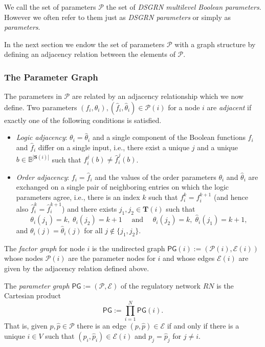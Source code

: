 \documentclass[12pt, notitlepage]{amsart}
\newcommand{\cE}{{\mathcal E}}
\newcommand{\cP}{{\mathcal P}}
\theoremstyle{definition}
\newcommand{\Targets}{\mathbf{T}}
\newcommand{\Sources}{\mathbf{S}}
\newcommand{\PG}{\mathsf{PG}}
\newcommand{\bbB}{\mathbb{B}}
\begin{document}
  We call the set of parameters $\cP$ the set of \textit{DSGRN multilevel Boolean parameters}. However we often refer to them just as \emph{DSGRN parameters} or simply as \textit{parameters}.

  In the next section we endow the set of parameters $\cP$ with a graph structure by defining an adjacency relation between the elements of $\cP$.

  \subsubsection{The Parameter Graph}
  \label{sec:PG}

  The parameters in $\cP$ are related by an adjacency relationship which we now define. Two parameters $(f_i, \theta_i), (\hat{f}_i, \hat{\theta}_i) \in \cP(i)$ for a node $i$ are \textit{adjacent} if exactly one of the following conditions is satisfied.

  \begin{itemize}
    \item \textit{Logic adjacency}: $\theta_i = \hat\theta_i$ and a single component of the Boolean functions $f_i$ and $\hat f_i$ differ on a single input, i.e., there exist a unique $j$ and a unique $b\in\bbB^{|\Sources(i)|}$ such that $f^j_i(b) \neq \hat{f}^j_i(b)$.

    \item \textit{Order adjacency}: $f_i=\hat f_i$ and the values of the order parameters $\theta_i$ and $\hat\theta_i$ are exchanged on a single pair of neighboring entries on which the logic parameters agree, i.e., there is an index $k$ such that $f^k_i= f^{k+1}_i$ (and hence also $\hat f^k_i= \hat f^{k+1}_i$) and  there exists $j_1, j_2 \in \Targets(i)$ such that
      \[
        \theta_i(j_1) = k, \; \theta_i(j_2) = k+1 \quad \mbox{ and } \quad \hat{\theta}_i(j_2) = k, \; \hat{\theta}_i(j_1) = k+1,
      \]
      and $\theta_i(j) = \hat{\theta}_i(j)$ for all $j \not\in \{j_1, j_2\}$.
  \end{itemize}

  The \textit{factor graph} for node $i$ is the undirected graph $\PG(i) := (\cP(i), \cE(i))$ whose nodes $\cP(i)$ are the parameter nodes for $i$ and whose edges $\cE(i)$ are given by the adjacency relation defined above.

  The \textit{parameter graph} $\PG := (\cP, \cE)$ of the regulatory network $RN$ is the Cartesian product
  \[
    \PG := \prod_{i=1}^{N} \PG(i).
  \]
  That is, given $p, \hat{p} \in \cP$ there is an edge $(p, \hat{p}) \in \cE$ if and only if there is a unique $i \in V$ such that $(p_i, \hat{p}_i) \in \cE(i)$ and $p_j = \hat{p}_j$ for $j \neq i$.
\end{document}

